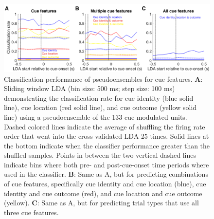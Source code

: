 \documentclass[11pt]{article}
\newcommand{\bsf}[1]{\textbf{#1}}
\begin{document}
  \begin{figure}[ht!]
\centering
\includegraphics[width=\textwidth]{Fig 6 - LDA.pdf}
\caption{Classification performance of pseudoensembles for cue features. \bsf{A}: Sliding window LDA (bin size: 500 ms; step size: 100 ms) demonstrating the classification rate for cue identity (blue solid line), cue location (red solid line), and cue outcome (yellow solid line) using a pseudoensemble of the 133 cue-modulated units. Dashed colored lines indicate the average of shuffling the firing rate order that went into the cross-validated LDA 25 times. Solid lines at the bottom indicate when the classifier performance greater than the shuffled samples. Points in between the two vertical dashed lines indicate bins where both pre- and post-cue-onset time periods where used in the classifier. \bsf{B}: Same as A, but for predicting combinations of cue features, specifically cue identity and cue location (blue), cue identity and cue outcome (red), and cue location and cue outcome (yellow). \bsf{C}: Same as A, but for predicting trial types that use all three cue features.}
\label{fig:LDA}
\end{figure} \clearpage
\end{document}

